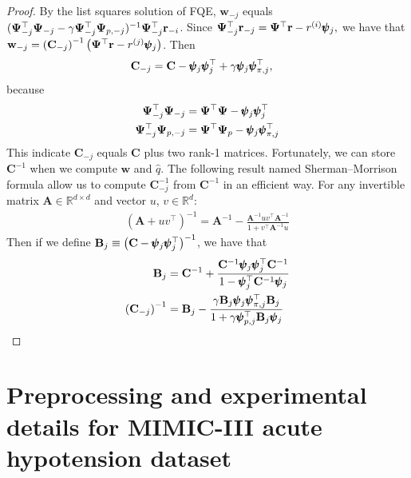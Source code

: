 \documentclass{article}
\begin{document}
\begin{proof}
By the list squares solution of FQE,
$\mathbf{w}_{-j}$ equals $(\mathbf{\Psi}_{-j}^\top \mathbf{\Psi}_{-j} - \gamma \mathbf{\Psi}_{-j}^\top \mathbf{\Psi}_{p,-j})^{-1}\mathbf{\Psi}_{-j}^\top \mathbf{r}_{-i}$.
Since 
$\mathbf{\Psi}_{-j}^\top \mathbf{r}_{-j} = \mathbf{\Psi}^\top \mathbf{r} - r^{(i)} \pmb{\psi}_j,
$
we have that $\mathbf{w}_{-j} = \left(\mathbf{C}_{-j}\right)^{-1}\left( \mathbf{\Psi}^\top \mathbf{r} - r^{(j)} \pmb{\psi}_j \right)$. Then
\begin{align}
    \mathbf{C}_{-j} &= \mathbf{C} - \pmb{\psi}_j \pmb{\psi}_j^\top + \gamma \pmb{\psi}_j \pmb{\psi}_{\pi,j}^\top,
\end{align}
because
\begin{align}
    \mathbf{\Psi}_{-j}^\top \mathbf{\Psi}_{-j} &= \mathbf{\Psi}^\top \mathbf{\Psi} - \pmb{\psi}_j \pmb{\psi}_j^\top\\
    \mathbf{\Psi}_{-j}^\top \mathbf{\Psi}_{p,-j} &= \mathbf{\Psi}^\top \mathbf{\Psi}_p - \pmb{\psi}_j \pmb{\psi}_{\pi,j}^\top
\end{align}
This indicate $\mathbf{C}_{-j}$ equals $\mathbf{C}$ plus two rank-1 matrices. Fortunately, we can store $\mathbf{C}^{-1}$ when we compute $\mathbf{w}$ and $\hat{q}$. The following result named Sherman–Morrison formula allow us to compute $\mathbf{C}_{-j}^{-1}$ from $\mathbf{C}^{-1}$ in an efficient way. For any invertible matrix $\mathbf{A} \in \mathbb{R}^{d \times d}$ and vector $u$, $v \in \mathbb{R}^d$:
\begin{align}
    (\mathbf{A} + uv^\top)^{-1} = \mathbf{A}^{-1} - \frac{\mathbf{A}^{-1} uv^\top \mathbf{A}^{-1}}{1+ v^{\top}\mathbf{A}^{-1}u}
\end{align}
Then if we define $\mathbf{B}_{j} \equiv \left(\mathbf{C} - \pmb{\psi}_j \pmb{\psi}_j^\top\right)^{-1}$, we have that
\begin{align}
    \mathbf{B}_{j} &= \mathbf{C}^{-1} + \frac{\mathbf{C}^{-1} \pmb{\psi}_j \pmb{\psi}_j^\top \mathbf{C}^{-1}}{1- \pmb{\psi}_{j}^{\top}\mathbf{C}^{-1}\pmb{\psi}_{j}}\\
    \left(\mathbf{C}_{-j}\right)^{-1} &= \mathbf{B}_{j} - \frac{\gamma \mathbf{B}_{j} \pmb{\psi}_j \pmb{\psi}_{\pi,j}^\top \mathbf{B}_{j}}{1+ \gamma \pmb{\psi}_{p,j}^{\top}\mathbf{B}_{j}\pmb{\psi}_{j}} 
\end{align}
\end{proof}

\section{Preprocessing and experimental details for MIMIC-III acute hypotension dataset}
\label{appendix:mimic_details}
\end{document}
